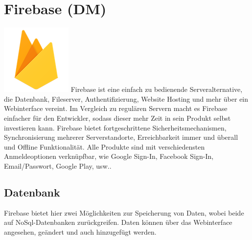 \section{Firebase (DM)}
\includegraphics{images/firebaseLogo.png} \cite{noauthor_firebaselogo_nodate}
\newline
Firebase ist eine einfach zu bedienende Serveralternative, die Datenbank, Fileserver, Authentifizierung, Website Hosting und mehr über ein Webinterface vereint. Im Vergleich zu regulären Servern macht es Firebase einfacher für den Entwickler, sodass dieser mehr Zeit in sein Produkt selbst investieren kann. 
Firebase bietet fortgeschrittene Sicherheitsmechanismen, Synchronisierung mehrerer Serverstandorte, Erreichbarkeit immer und überall und Offline Funktionalität.
Alle Produkte sind mit verschiedensten Anmeldeoptionen verknüpfbar, wie Google Sign-In,
Facebook Sign-In, Email/Passwort, Google Play, usw..
\subsection{Datenbank}
Firebase bietet hier zwei Möglichkeiten zur Speicherung von Daten, wobei beide auf NoSql-Datenbanken zurückgreifen. Daten können über das Webinterface angesehen, geändert und auch hinzugefügt werden.
